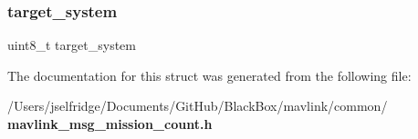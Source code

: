 \mbox{\label{struct____mavlink__mission__count__t_ac9afff43526a157e4c4e45607c1418b8}} 
\subsubsection{target\+\_\+system}
{\footnotesize\ttfamily uint8\+\_\+t target\+\_\+system}



The documentation for this struct was generated from the following file\+:\begin{DoxyCompactItemize}
\item 
/\+Users/jselfridge/\+Documents/\+Git\+Hub/\+Black\+Box/mavlink/common/\textbf{ mavlink\+\_\+msg\+\_\+mission\+\_\+count.\+h}\end{DoxyCompactItemize}
